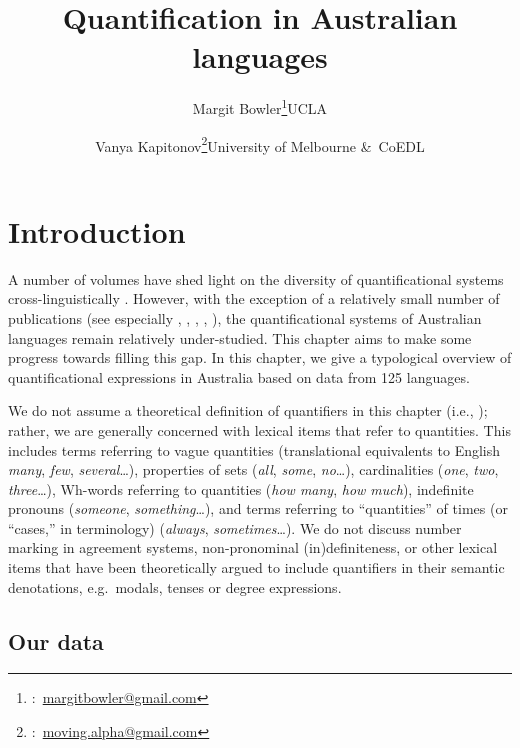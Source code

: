 \documentclass[12pt,egregdoesnotlikesansseriftitles]{scrartcl}
\title{Quantification in Australian languages}
\author{Margit Bowler\thanks{\Letter:~\href{mailto:margitbowler@gmail.com}{margitbowler@gmail.com}}\authorcr UCLA \and \vspace{-.5cm}Vanya Kapitonov\thanks{\Letter:~\href{mailto:moving.alpha@gmail.com}{moving.alpha@gmail.com}}\authorcr University of Melbourne \&\ CoEDL}
\begin{document}
\maketitle

\section{Introduction}

A number of volumes have shed light on the diversity of quantificational systems cross-linguistically \citep{bachetal95,qclp08,keenanpaperno12,keenanpaperno17}. However, with the exception of a relatively small number of publications (see especially \citealt{bowler17}, \citealt{bowernzentz12}, \citealt{bittnerhale95}, \citealt{evans95}, \citealt{laughren81}), the quantificational systems of Australian languages remain relatively under-studied. This chapter aims to make some progress towards filling this gap. In this chapter, we give a typological overview of quantificational expressions in Australia based on data from 125 languages.

We do not assume a theoretical definition of quantifiers in this chapter (i.e., \citealt{heimkratzer98}); rather, we are generally concerned with lexical items that refer to quantities. This includes terms referring to vague quantities (translational equivalents to English \textit{many}, \textit{few}, \textit{several}\ldots), properties of sets (\textit{all}, \textit{some}, \textit{no}\ldots), cardinalities (\textit{one}, \textit{two}, \textit{three}\ldots), Wh-words referring to quantities (\textit{how many}, \textit{how much}), indefinite pronouns (\textit{someone}, \textit{something}\ldots), and terms referring to ``quantities'' of times (or ``cases,'' in  terminology) (\textit{always}, \textit{sometimes}\ldots). We do not discuss number marking in agreement systems, non-pronominal (in)definiteness, or other lexical items that have been theoretically argued to include quantifiers in their semantic denotations, e.g.\ modals, tenses or degree expressions.


\subsection{Our data}

\end{document}
